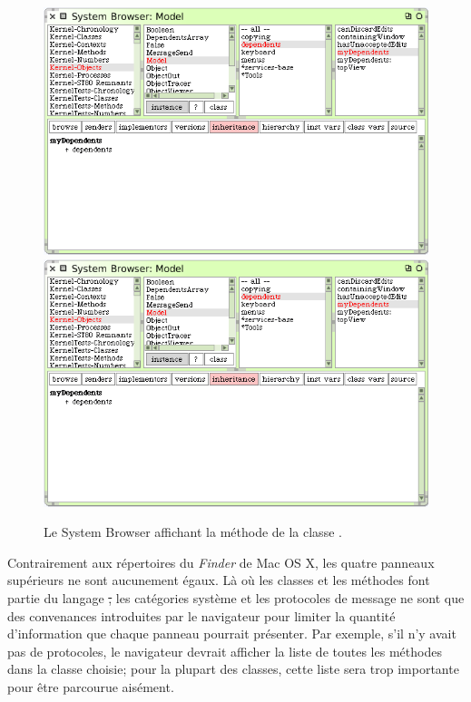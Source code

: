 \documentclass[a4paper,10pt,twoside]{book}
\begin{document}
\begin{figure}[htbp]
   \centering
   \ifluluelse
	   {\includegraphics[width=\textwidth]{SystemBrowserMyDependents}}
	   {\includegraphics[scale=.7]{SystemBrowserMyDependents}}
   \caption{Le System Browser affichant la m\'ethode  de la classe .
   \label{fig:SystemBrowserMyDependents}}
\end{figure}

Contrairement aux r\'epertoires du \emph{Finder} de Mac OS X, les quatre panneaux sup\'erieurs ne sont aucunement \'egaux.
L\`a o\`u les classes et les m\'ethodes font partie du langage \st,
les cat\'egories syst\`eme et les protocoles de message ne sont
que des convenances introduites par le navigateur pour limiter la quantit\'e d'information que chaque panneau pourrait pr\'esenter.
Par exemple, s'il n'y avait pas de protocoles, le navigateur devrait afficher
la liste de toutes les m\'ethodes dans la classe choisie; pour la plupart des classes, cette liste sera trop importante pour \^etre parcourue ais\'ement.
\end{document}
